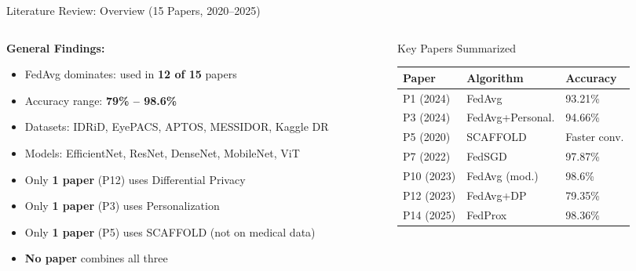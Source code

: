 \documentclass[aspectratio=169, 11pt]{beamer}
\begin{document}
\begin{frame}{Literature Review: Overview (15 Papers, 2020--2025)}
  \begin{columns}[T]
    \begin{column}{0.50\textwidth}
      \textbf{General Findings:}
      \begin{itemize}\small
        \item FedAvg dominates: used in \textbf{12 of 15} papers
        \item Accuracy range: \textbf{79\% -- 98.6\%}
        \item Datasets: IDRiD, EyePACS, APTOS, MESSIDOR, Kaggle DR
        \item Models: EfficientNet, ResNet, DenseNet, MobileNet, ViT
        \item Only \textbf{1 paper} (P12) uses Differential Privacy
        \item Only \textbf{1 paper} (P3) uses Personalization
        \item Only \textbf{1 paper} (P5) uses SCAFFOLD (not on medical data)
        \item \textbf{No paper} combines all three
      \end{itemize}
    \end{column}
    \begin{column}{0.47\textwidth}
      \begin{block}{Key Papers Summarized}
        \small\renewcommand{\arraystretch}{1.15}
        \begin{tabular}{lll}
          \textbf{Paper} & \textbf{Algorithm} & \textbf{Accuracy}\\
          \hline
          P1 (2024) & FedAvg & 93.21\%\\
          P3 (2024) & FedAvg+Personal. & 94.66\%\\
          P5 (2020) & SCAFFOLD & Faster conv.\\
          P7 (2022) & FedSGD & 97.87\%\\
          P10 (2023) & FedAvg (mod.) & 98.6\%\\
          P12 (2023) & FedAvg+DP & 79.35\%\\
          P14 (2025) & FedProx & 98.36\%\\
        \end{tabular}
      \end{block}
    \end{column}
  \end{columns}
\end{frame}
\end{document}
